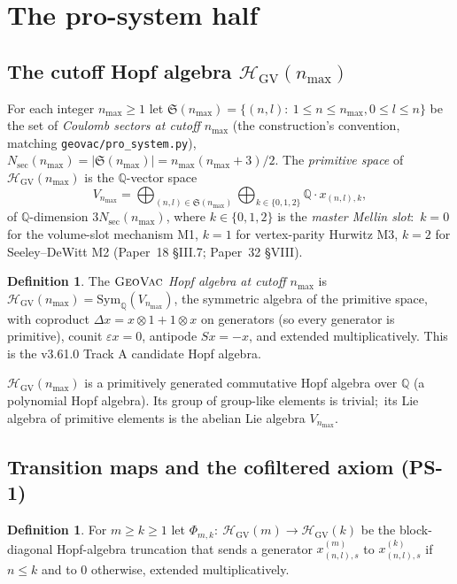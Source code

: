 \documentclass[11pt,a4paper]{article}
\theoremstyle{plain}
\theoremstyle{definition}
\newtheorem{definition}[theorem]{Definition}
\newcommand{\nmax}{n_{\max}}
\newcommand{\HGV}{\mathcal{H}_{\mathrm{GV}}}
\newcommand{\Sym}{\mathrm{Sym}}
\newcommand{\Q}{\mathbb{Q}}
\newcommand{\Sec}{\mathfrak{S}}
\newcommand{\Nsec}{N_{\mathrm{sec}}}
\begin{document}
\section{The pro-system half}\label{sec:pro_system}

\subsection{The cutoff Hopf algebra $\HGV(\nmax)$}\label{sec:hgv}

For each integer $\nmax \ge 1$ let
$\Sec(\nmax) = \{(n, l) :\ 1 \le n \le \nmax, 0 \le l \le n\}$ be the
set of \emph{Coulomb sectors at cutoff $\nmax$} (the construction's
convention, matching \texttt{geovac/pro\_system.py}), $\Nsec(\nmax) =
|\Sec(\nmax)| = \nmax(\nmax + 3)/2$. The \emph{primitive space} of
$\HGV(\nmax)$ is the $\Q$-vector space
\[
   V_{\nmax} = \bigoplus_{(n, l) \in \Sec(\nmax)} \bigoplus_{k \in \{0, 1, 2\}} \Q \cdot x_{(n, l), k},
\]
of $\Q$-dimension $3 \Nsec(\nmax)$, where $k \in \{0, 1, 2\}$ is the
\emph{master Mellin slot}:\ $k = 0$ for the volume-slot
mechanism M1, $k = 1$ for vertex-parity Hurwitz M3, $k = 2$ for
Seeley--DeWitt M2 (Paper~18 §III.7; Paper~32 §VIII).

\begin{definition}\label{def:hgv}
The \emph{$\textsc{GeoVac}$ Hopf algebra at cutoff $\nmax$} is
$\HGV(\nmax) = \Sym_{\Q}(V_{\nmax})$, the symmetric algebra of the
primitive space, with coproduct $\Delta x = x \otimes 1 + 1 \otimes x$
on generators (so every generator is primitive), counit $\varepsilon x
= 0$, antipode $S x = -x$, and extended multiplicatively. This is the
v3.61.0 Track A candidate Hopf algebra.
\end{definition}

$\HGV(\nmax)$ is a primitively generated commutative Hopf algebra over
$\Q$ (a polynomial Hopf algebra). Its group of group-like elements is
trivial;\ its Lie algebra of primitive elements is the abelian Lie
algebra $V_{\nmax}$.

\subsection{Transition maps and the cofiltered axiom (PS-1)}\label{sec:transitions}

\begin{definition}\label{def:transition_map}
For $m \ge k \ge 1$ let
$\Phi_{m, k} :\ \HGV(m) \to \HGV(k)$ be the block-diagonal Hopf-algebra
truncation that sends a generator $x^{(m)}_{(n, l), s}$ to
$x^{(k)}_{(n, l), s}$ if $n \le k$ and to $0$ otherwise, extended
multiplicatively.
\end{definition}
\end{document}
